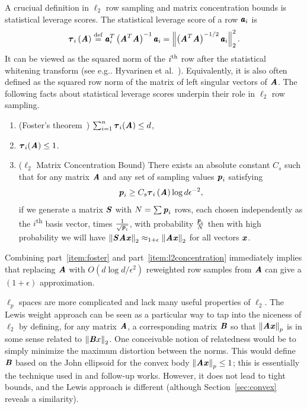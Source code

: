 A cruciual definition in $\ell_2$ row sampling and matrix concentration bounds is
statistical leverage scores.
The statistical leverage score of a row $\aa_i$ is
\begin{equation*}
\ttau_{i}\left(\AA\right)
\defeq \aa_i^T \left( \AA^T \AA \right)^{-1} \aa_i
= \norm{\left( \AA^T \AA \right)^{-1/2} \aa_i}_2^2.
\end{equation*}
It can be viewed as the squared norm of the $i\textsuperscript{th}$ row after the
statistical whitening transform (see e.g.. Hyvarinen et al.~\cite{HyvarinenO00}).
Equivalently, it is also often defined as the squared row norm of the matrix of left singular vectors
of $\AA$.
The following facts about statistical leverage scores underpin their role
in $\ell_2$ row sampling.
\begin{fact}
\label{fact:tau}
\begin{enumerate}
\item \label{item:foster} (Foster's theorem~\cite{Foster53}) $\sum_{i = 1}^{n} \ttau_{i} (\AA) \leq d$,
\item \label{item:upper1} $\ttau_{i}(\AA) \leq 1$.
\item \label{item:l2concentration} ($\ell_2$ Matrix Concentration Bound)
There exists an absolute constant $C_s$ such that for any matrix $\AA$ and any
set of sampling values $\pp_i$ satisfying
\begin{equation*}
\pp_i \geq C_s \ttau_{i} \left( \AA \right) \log{d} \epsilon^{-2},
\end{equation*}
if we generate a matrix $\SS$ with $N = \sum \pp_i$ rows, each chosen
independently as the $i$\textsuperscript{th} basis vector,
times $\frac{1}{\sqrt{\pp_i}}$, with probability $\frac{\pp_i}{N}$
then with high probability we will have
$\norm{\SS \AA \xx}_2 \approx_{1 + \epsilon} \norm{\AA \xx}_2$ for all vectors $\xx$.
\end{enumerate}
\end{fact}
Combining part~\ref{item:foster} and part~\ref{item:l2concentration} immediately implies that replacing
$\AA$ with $O(d \log d / \epsilon^2)$ reweighted row samples from $\AA$ can give a $(1+\epsilon)$ approximation.

$\ell_p$ spaces are more complicated and lack many useful properties of $\ell_2$.
The Lewis weight approach can be seen as a particular way to tap into the niceness of $\ell_2$
by defining, for any matrix $\AA$, a corresponding matrix $\BB$ so that $\norm{\AA \xx}_p$
is in some sense related to $\norm{\BB x}_2$.  One conceivable notion of relatedness would be
to simply minimize the maximum distortion between the norms.  This would define $\BB$ based on
the John ellipsoid for the convex body $\norm{\AA \xx}_p \leq 1$; this is essentially the technique
used in \cite{DasguptaDHKM09} and follow-up works.  However, it does not lead to tight bounds, and
the Lewis approach is different (although Section~\ref{sec:convex} reveals a similarity).

